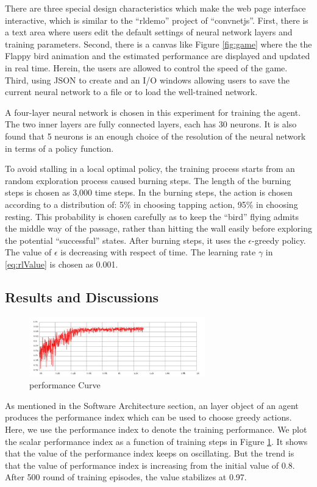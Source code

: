 \documentclass[conference,compsoc]{IEEEtran}
\begin{document}
There are three special design characteristics which make the web page interface interactive, which is similar to the ``rldemo'' project of ``convnetjs''. \cite{convnetjs} First, there is a text area where users edit the default settings of neural network layers and training parameters. Second, there is a canvas like Figure \ref{fig:game} where the the Flappy bird animation and the estimated performance are displayed and updated in real time. Herein, the users are allowed to control the speed of the game. Third, using JSON to create and an I/O windows allowing users to save the current neural network to a file or to load the well-trained network.  

A four-layer neural network is chosen in this experiment for training the agent. The two inner layers are fully connected layers, each has 30 neurons. It is also found that 5 neurons is an enough choice of the resolution of the neural network in terms of a policy function. 

To avoid stalling in a local optimal policy, the training process starts from an random exploration process caused burning steps. The length of the burning steps is chosen as 3,000 time steps. In the burning steps, the action is chosen according to a distribution of: 5\% in choosing tapping action, 95\% in choosing resting. This probability is chosen carefully as to keep the ``bird'' flying admits the middle way of the passage, rather than hitting the wall easily before exploring the potential ``successful'' states. After burning steps, it uses the $\epsilon$-greedy policy. The value of $\epsilon$ is decreasing with respect of time. The learning rate $\gamma$ in \eqref{eq:rlValue} is chosen as 0.001. 

\subsection{Results and Discussions}
\begin{figure}[!t]
\centering
\includegraphics[width=3in]{performanceCurve.jpeg}
\caption{performance Curve}
\label{fig:performanceCurve}
\end{figure}
As mentioned in the Software Architecture section, an layer object of an agent produces the performance index which can be used to choose greedy actions. Here, we use the performance index to denote the training performance. We plot the scalar performance index as a function of training steps in Figure \ref{fig:performanceCurve}. It shows that the value of the performance index keeps on oscillating. But the trend is that the value of performance index is increasing from the initial value of 0.8. After 500 round of training episodes, the value stabilizes at 0.97. 
\end{document}
